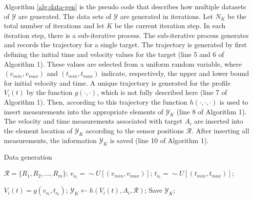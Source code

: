 \documentclass[letterpaper, 10 pt, conference]{ieeeconf}
\begin{document}
Algorithm \ref{alg:data-gen} is the pseudo code that describes how multiple datasets of $\mathcal{Y}$ are generated. The data sets of $\mathcal{Y}$ are generated in iterations. Let $N_K$ be the total number of iterations and let $K$ be the current iteration step. In each iteration step, there is a sub-iterative process. The sub-iterative process generates and records the trajectory for a single target. The trajectory is generated by first defining the initial time and velocity values for the target (line 5 and 6 of Algorithm 1). These values are selected from a uniform random variable, where $(v_{min}, v_{max})$ and $(t_{min},t_{max})$ indicate, respectively, the upper and lower bound for initial velocity and time. A unique trajectory is generated for the profile $V_i(t)$ by the function $g(\cdot,\cdot)$, which is not fully described here (line 7 of Algorithm 1). Then, according to this trajectory the function $h(\cdot,\cdot,\cdot)$ is used to insert measurements into the appropriate elements of $\mathcal{Y}_K$ (line 8 of Algorithm 1). The velocity and time measurements associated with target $A_i$ are inserted into the element location of $\mathcal{Y}_K$ according to the sensor positions $\mathcal{R}$. After inserting all measurements, the information $\mathcal{Y}_K$ is saved (line 10 of Algorithm 1). 

\begin{algorithm}
\caption{Data generation}\label{alg:data-gen}
\begin{algorithmic}[1]
\State $\mathcal{R} =  \{R_1,R_2,...,R_m\}$;
\State  $v_{o_i}= \sim U [(v_{min},v_{max})]$;
\State  $t_{o_i} = \sim U [(t_{min},t_{max})]$;

\State $V_i(t) = g(v_{o_i},t_{o_i})$;
\State $\mathcal{Y}_K\leftarrow h(V_i(t),A_i,\mathcal{R})$;
\EndFor 
\State Save $\mathcal{Y}_K$;
\EndFor
\end{algorithmic}
\end{algorithm}


\end{document}
